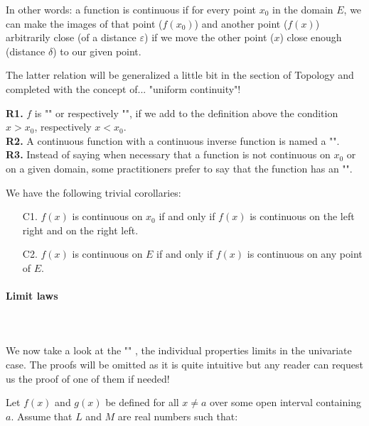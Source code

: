 	In other words: a function is continuous if for every point $x_0$ in the domain $E$, we can make the images of that point ($f(x_0)$) and another point ($f(x)$) arbitrarily close (of a distance $\varepsilon$) if we move the other point ($x$) close enough (distance $\delta$) to our given point.
	
	The latter relation will be generalized a little bit in the section of Topology and completed with the concept of... "uniform continuity"!
	\begin{tcolorbox}[title=Remarks,colframe=black,arc=10pt]
	\textbf{R1. }$f$ is "" or respectively "", if we add to the definition above the condition $x>x_0$, respectively $x<x_0$.\\
	
	\textbf{R2.} A continuous function with a continuous inverse function is named a "".\\
	
	\textbf{R3.} Instead of saying when necessary that a function is not continuous on $x_0$ or on a given domain, some practitioners prefer to say that the function has an "".
	\end{tcolorbox}	
	We have the following trivial corollaries:
	\begin{enumerate}
		\item[C1.] $f(x)$ is continuous on $x_0$ if and only if $f(x)$ is continuous on the left right and on the right left.
		
		\item[C2.] $f(x)$ is continuous on $E$ if and only if $f(x)$ is continuous on any point of $E$.
	\end{enumerate}
	
	\paragraph{Limit laws}\mbox{}\\\\
	We now take a look at the "" , the individual properties limits in the univariate case. The proofs will be omitted as it is quite intuitive but any reader can request us the proof of one of them if needed!
	
	Let $f(x)$ and $g(x)$ be defined for all $x\neq a$ over some open interval containing $a$. Assume that $L$ and $M$ are real numbers such that:
	
